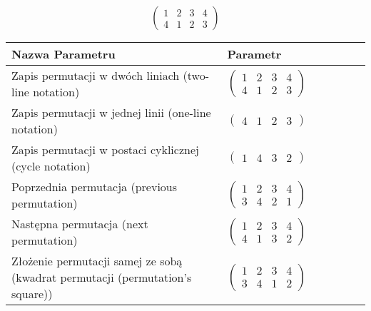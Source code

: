 \documentclass[12pt]{article}
\begin{document}
\subsection{}
\begin{center}
\[
\begin{pmatrix}
	1 & 2 & 3 & 4 \\ 
	4 & 1 & 2 & 3 
\end{pmatrix}
\]

\begin{tabular}{|m{0.6\linewidth}|m{0.4\linewidth}|}
	\hline
	Nazwa Parametru & Parametr \\
	\hline
	Zapis permutacji w dwóch liniach (two-line notation) & $\begin{pmatrix} 1 & 2 & 3 & 4 \\ 
4 & 1 & 2 & 3 \end{pmatrix}$ \\ 
	\hline
	Zapis permutacji w jednej linii (one-line notation) & $\begin{pmatrix} 4 & 1 & 2 & 3 \end{pmatrix}$ \\ 
	\hline
	Zapis permutacji w postaci cyklicznej (cycle notation) & $\begin{pmatrix} 1 & 4 & 3 & 2 \end{pmatrix} $ \\ 
	\hline
	Poprzednia permutacja (previous permutation) & $\begin{pmatrix} 1 & 2 & 3 & 4 \\ 
3 & 4 & 2 & 1 \end{pmatrix}$ \\ 
	\hline
	Następna permutacja (next permutation) & $\begin{pmatrix} 1 & 2 & 3 & 4 \\ 
4 & 1 & 3 & 2 \end{pmatrix}$ \\ 
	\hline
	Złożenie permutacji samej ze sobą (kwadrat permutacji (permutation's square)) & $\begin{pmatrix} 1 & 2 & 3 & 4 \\ 
3 & 4 & 1 & 2 \end{pmatrix}$ \\ 
	\hline
\end{tabular}
\end{center}
\end{document}
